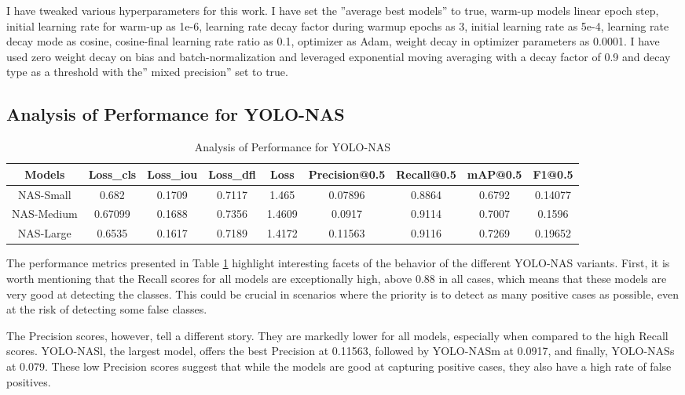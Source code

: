 I have tweaked various hyperparameters for this work. I have set the ”average best models” to true, warm-up models linear epoch step, initial learning rate for warm-up as 1e-6, learning rate decay factor during warmup epochs as 3, initial learning rate as 5e-4, learning rate decay mode as cosine, cosine-final learning rate ratio as 0.1, optimizer as Adam, weight decay in optimizer parameters as 0.0001. I have used zero weight decay on bias and batch-normalization and leveraged exponential moving averaging with a decay factor of 0.9 and decay type as a threshold with the” mixed precision” set to true.
\newpage
\subsection{Analysis of Performance for YOLO-NAS}

\begin{table}[!htbp]
    \centering
    \caption{Analysis of Performance for YOLO-NAS}
    \label{tab:my_label}
    \footnotesize
    \begin{tabular}{|c|c|c|c|c|c|c|c|c|}
    \hline
     Models &  Loss\_cls&  Loss\_iou& Loss\_dfl & Loss &  Precision@0.5&  Recall@0.5&  mAP@0.5& F1@0.5\\
    \hline
    NAS-Small&  0.682&  0.1709&  0.7117&  1.465&  0.07896&  0.8864&  0.6792& 0.14077\\
    \hline
    NAS-Medium& 0.67099 &  0.1688&  0.7356&  1.4609& 0.0917 &  0.9114 & 0.7007 & 0.1596\\
    \hline
    NAS-Large& 0.6535 &  0.1617&  0.7189& 1.4172 &  0.11563&  0.9116&  0.7269& 0.19652\\
         \hline
    \end{tabular}
\end{table}

The performance metrics presented in Table \ref{tab:my_label} highlight interesting facets of the behavior of the different YOLO-NAS variants. First, it is worth mentioning that the Recall scores for all models are exceptionally high, above 0.88 in all cases, which means that these models are very good at detecting the classes. This could be crucial in scenarios where the priority is to detect as many positive cases as possible, even at the risk of detecting some false classes.


The Precision scores, however, tell a different story. They are markedly lower for all models, especially when compared to the high Recall scores. YOLO-NASl, the largest model, offers the best Precision at 0.11563, followed by YOLO-NASm at 0.0917, and finally, YOLO-NASs at 0.079. These low Precision scores suggest that while the models are good at capturing positive cases, they also have a high rate of false positives. 

